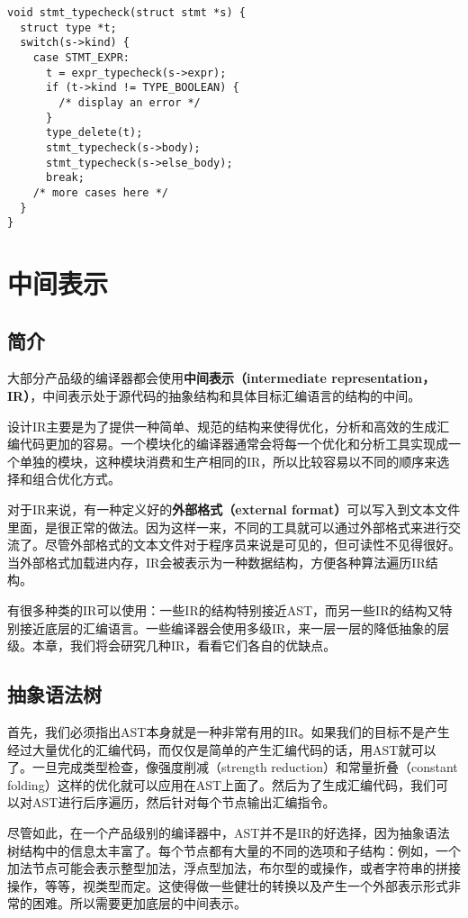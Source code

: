 \documentclass[cn,11pt,chinese]{elegantbook}
\begin{document}
\begin{verbatim}
void stmt_typecheck(struct stmt *s) {
  struct type *t;
  switch(s->kind) {
    case STMT_EXPR:
      t = expr_typecheck(s->expr);
      if (t->kind != TYPE_BOOLEAN) {
        /* display an error */
      }
      type_delete(t);
      stmt_typecheck(s->body);
      stmt_typecheck(s->else_body);
      break;
    /* more cases here */
  }
}
\end{verbatim}

\chapter{中间表示}

\section{简介}

大部分产品级的编译器都会使用\textbf{中间表示（intermediate representation，IR）}，中间表示处于源代码的抽象结构和具体目标汇编语言的结构的中间。

设计IR主要是为了提供一种简单、规范的结构来使得优化，分析和高效的生成汇编代码更加的容易。一个模块化的编译器通常会将每一个优化和分析工具实现成一个单独的模块，这种模块消费和生产相同的IR，所以比较容易以不同的顺序来选择和组合优化方式。

对于IR来说，有一种定义好的\textbf{外部格式（external format）}可以写入到文本文件里面，是很正常的做法。因为这样一来，不同的工具就可以通过外部格式来进行交流了。尽管外部格式的文本文件对于程序员来说是可见的，但可读性不见得很好。当外部格式加载进内存，IR会被表示为一种数据结构，方便各种算法遍历IR结构。

有很多种类的IR可以使用：一些IR的结构特别接近AST，而另一些IR的结构又特别接近底层的汇编语言。一些编译器会使用多级IR，来一层一层的降低抽象的层级。本章，我们将会研究几种IR，看看它们各自的优缺点。

\section{抽象语法树}

首先，我们必须指出AST本身就是一种非常有用的IR。如果我们的目标不是产生经过大量优化的汇编代码，而仅仅是简单的产生汇编代码的话，用AST就可以了。一旦完成类型检查，像强度削减（strength reduction）和常量折叠（constant folding）这样的优化就可以应用在AST上面了。然后为了生成汇编代码，我们可以对AST进行后序遍历，然后针对每个节点输出汇编指令。

尽管如此，在一个产品级别的编译器中，AST并不是IR的好选择，因为抽象语法树结构中的信息太丰富了。每个节点都有大量的不同的选项和子结构：例如，一个加法节点可能会表示整型加法，浮点型加法，布尔型的或操作，或者字符串的拼接操作，等等，视类型而定。这使得做一些健壮的转换以及产生一个外部表示形式非常的困难。所以需要更加底层的中间表示。
\end{document}
